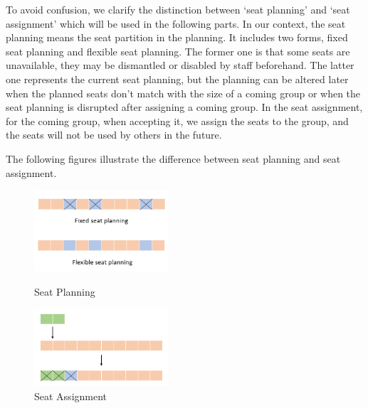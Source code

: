 

To avoid confusion, we clarify the distinction between `seat planning' and `seat assignment' which will be used in the following parts. In our context, the seat planning means the seat partition in the planning. It includes two forms, fixed seat planning and flexible seat planning. The former one is that some seats are unavailable, they may be dismantled or disabled by staff beforehand. The latter one represents the current seat planning, but the planning can be altered later when the planned seats don't match with the size of a coming group or when the seat planning is disrupted after assigning a coming group. In the seat assignment, for the coming group, when accepting it, we assign the seats to the group, and the seats will not be used by others in the future.

The following figures illustrate the difference between seat planning and seat assignment.

\begin{figure}[htbp]
    \centering
    \begin{minipage}[t]{0.48\textwidth}
    \centering
    \includegraphics[width=5cm]{./Figures/seat_planning.png}
    \caption{Seat Planning}
    \end{minipage}
    \begin{minipage}[t]{0.48\textwidth}
    \centering
    \includegraphics[width=5cm]{./Figures/seat_assignment.png}
    \caption{Seat Assignment}
    \end{minipage}
\end{figure}


